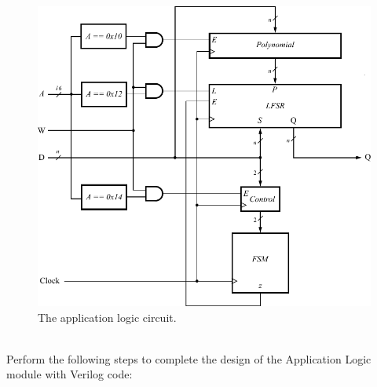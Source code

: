 \documentclass[epsfig,10pt,fullpage]{article}
\begin{document}
\begin{figure}[ht]
   \begin{center}
       \includegraphics[scale=1.0]{figures/application.pdf}
   \end{center}
   \caption{The application logic circuit.}
	\label{fig:appl}
\end{figure}

~\\
\noindent
Perform the following steps to complete the design of the Application Logic module 
with Verilog code:
\end{document}
